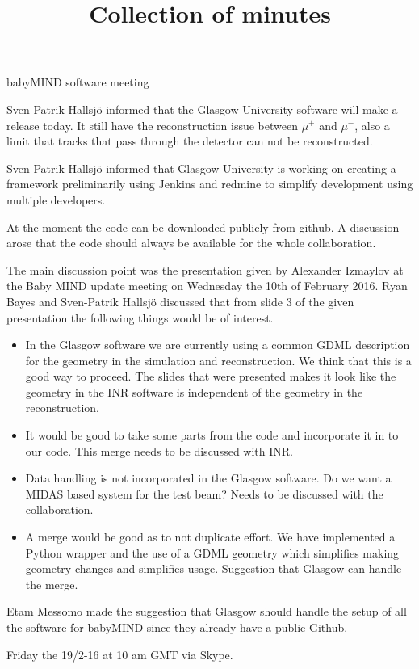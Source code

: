 \documentclass{article}
\title{Collection of minutes}
\author{\LaTeXe}
\begin{document}
\begin{Minutes}{babyMIND software meeting}
\maketitle

Sven-Patrik Hallsj\"o informed that the Glasgow University software will make a release today. It still have the reconstruction issue between $\mu^+$ and $\mu^-$, also a limit that tracks that pass through the detector can not be reconstructed. 

Sven-Patrik Hallsj\"o informed that Glasgow University is working on creating a framework preliminarily using Jenkins and redmine to simplify development using multiple developers. 

At the moment the code can be downloaded publicly from github. A discussion arose that the code should always be available for the whole collaboration.

The main discussion point was the presentation given by Alexander Izmaylov at the Baby MIND update meeting on Wednesday the 10th of February 2016.
Ryan Bayes and Sven-Patrik Hallsj\"o  discussed that from slide 3 of the given presentation the following things would be of interest.
\begin{itemize}
\item In the Glasgow software we are currently using a common GDML description for the geometry in the simulation and reconstruction. We think that this is a good way to proceed. The slides that were presented makes it look like the geometry in the INR software is independent of the geometry in the reconstruction.
\item It would be good to take some parts from the code and incorporate it in to our code. This merge needs to be discussed with INR.
\item Data handling is not incorporated in the Glasgow software. Do we want a MIDAS based system for the test beam? Needs to be discussed with the collaboration.
\item A merge would be good as to not duplicate effort. We have implemented a Python wrapper and the use of a GDML geometry which simplifies making geometry changes and simplifies usage. Suggestion that Glasgow can handle the merge.
\end{itemize}

Etam Messomo made the suggestion that Glasgow should handle the setup of all the software for babyMIND since they already have a public Github.  

Friday the 19/2-16 at 10 am GMT via Skype.

\end{Minutes}
\end{document}
